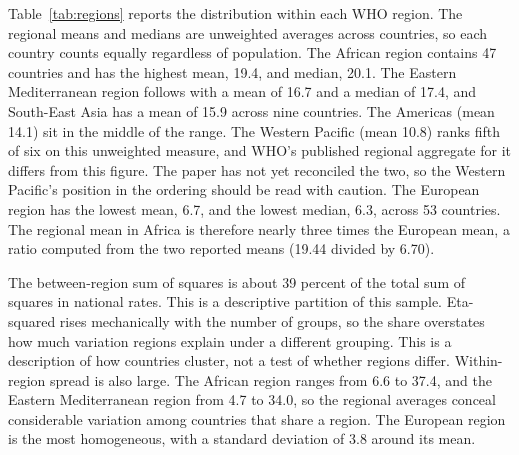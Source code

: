 \documentclass[12pt]{article}
\begin{document}
Table~\ref{tab:regions} reports the distribution within each WHO region. The regional means and medians are unweighted averages across countries, so each country counts equally regardless of population. The African region contains 47 countries and has the highest mean, 19.4, and median, 20.1.
The Eastern Mediterranean region follows with a mean of 16.7 and a median of 17.4, and South-East Asia has a mean of 15.9 across nine countries.
The Americas (mean 14.1) sit in the middle of the range. The Western Pacific (mean 10.8) ranks fifth of six on this unweighted measure, and WHO's published regional aggregate for it differs from this figure. The paper has not yet reconciled the two, so the Western Pacific's position in the ordering should be read with caution.
The European region has the lowest mean, 6.7, and the lowest median, 6.3, across 53 countries. The regional mean in Africa is therefore nearly three times the European mean, a ratio computed from the two reported means (19.44 divided by 6.70).

The between-region sum of squares is about 39 percent of the total sum of squares in national rates. This is a descriptive partition of this sample. Eta-squared rises mechanically with the number of groups, so the share overstates how much variation regions explain under a different grouping.
This is a description of how countries cluster, not a test of whether regions differ. Within-region spread is also large. The African region ranges from 6.6 to 37.4, and the Eastern Mediterranean region from 4.7 to 34.0, so the regional averages conceal considerable variation among countries that share a region. The European region is the most homogeneous, with a standard deviation of 3.8 around its mean.
\end{document}
